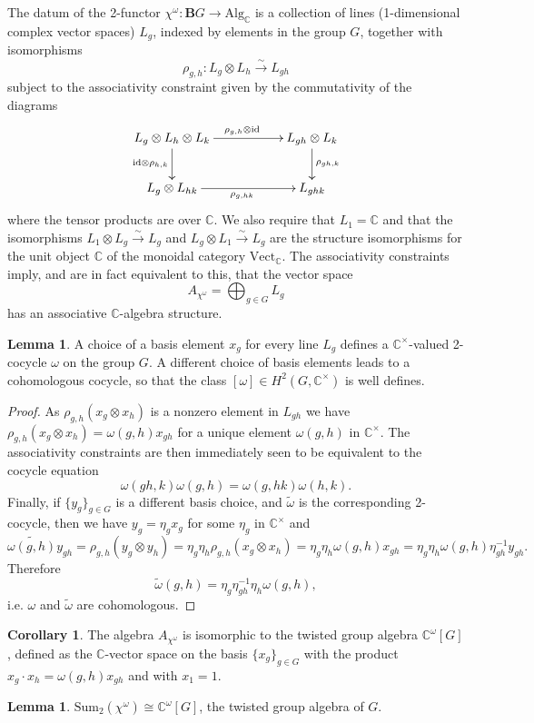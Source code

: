 \documentclass[12pt]{scrartcl}
\newcommand{\boldB}{\boldsymbol{B}}
\newcommand{\C}{\mathds{C}}
\theoremstyle{definition}
\newtheorem{lemma}[definition]{Lemma}
\newtheorem{corollary}[definition]{Corollary}
\numberwithin{equation}{section}
\numberwithin{definition}{section}
\numberwithin{figure}{section}
\begin{document}
The datum of the 2-functor $\chi^\omega \colon \boldB G \to \text{Alg}_\C$ is a collection of lines (1-dimensional complex vector spaces) $L_g$, indexed by elements in the group $G$, together with isomorphisms
\[
\rho_{g,h}\colon L_g\otimes L_h\xrightarrow{\sim} L_{gh}
\]
subject to the associativity constraint given by the commutativity of the diagrams
\[
\xymatrix{
L_g\otimes L_h\otimes L_k\ar[rr]^{\rho_{g,h}\otimes \mathrm{id}}\ar[d]_{\mathrm{id}\otimes \rho_{h,k}}&& L_{gh}\otimes L_k\ar[d]^{\rho_{gh,k}}\\
L_g\otimes L_{hk}\ar[rr]_{\rho_{g,hk}} &&L_{ghk}
}
\]
where the tensor products are over $\C$. We also require that $L_1=\C$ and that the isomorphisms $L_1\otimes L_g\xrightarrow{\sim}L_g$ and $L_g\otimes L_1\xrightarrow{\sim}L_g$ are the structure isomorphisms for the unit object $\C$ of the monoidal category $\mathrm{Vect}_\C$.
The associativity constraints imply, and are in fact equivalent to this, that the vector space
\[
A_{\chi^\omega}=\bigoplus_{g\in G} L_g
\]
has an associative $\C$-algebra structure.
\begin{lemma}
A choice of a basis element $x_g$ for every line $L_g$ defines a $\C^\times$-valued 2-cocycle $\omega$ on the group $G$. A different choice of basis elements leads to a cohomologous cocycle, so that the class $[\omega]\in H^2(G,\C^\times)$ is well defines.
\end{lemma}
\begin{proof}
As $\rho_{g,h}(x_g\otimes x_h)$ is a nonzero element in $L_{gh}$ we have $\rho_{g,h}(x_g\otimes x_h)=\omega(g,h)x_{gh}$ for a unique element $\omega(g,h)$ in $\C^\times$. The associativity constraints are then immediately seen to be equivalent to the cocycle equation
\[
\omega(gh,k)\omega(g,h)=\omega(g,hk)\omega(h,k).
\]
Finally, if $\{y_g\}_{g\in G}$ is a different basis choice, and $\tilde{\omega}$ is the corresponding 2-cocycle, then we have $y_g=\eta_gx_g$ for some $\eta_g$ in $\C^\times$ and
\[
\tilde{\omega(g,h)}y_{gh}=\rho_{g,h}(y_g\otimes y_h)=\eta_g\eta_h\rho_{g,h}(x_g\otimes x_h)=\eta_g\eta_h\omega(g,h)x_{gh}=\eta_g\eta_h\omega(g,h)\eta_{gh}^{-1}y_{gh}.
\]
Therefore
\[
\tilde{\omega}(g,h)=\eta_g\eta_{gh}^{-1}\eta_h\omega(g,h),
\]
i.e. $\omega$ and $\tilde{\omega}$ are cohomologous.
\end{proof}
\begin{corollary}
The algebra $A_{\chi^\omega}$ is isomorphic to the twisted group algebra $\C^\omega[G]$, defined as the $\C$-vector space on the basis $\{x_g\}_{g\in G}$ with the product $x_g\cdot x_h=\omega(g,h)x_{gh}$ and with $x_1=1$.
\end{corollary}
\begin{lemma}\label{lemma:cocone-is-coinvariants}
$\text{Sum}_2(\chi^\omega) \cong \C^\omega[G]$, the  twisted group algebra of $G$.
\end{lemma}
\end{document}
